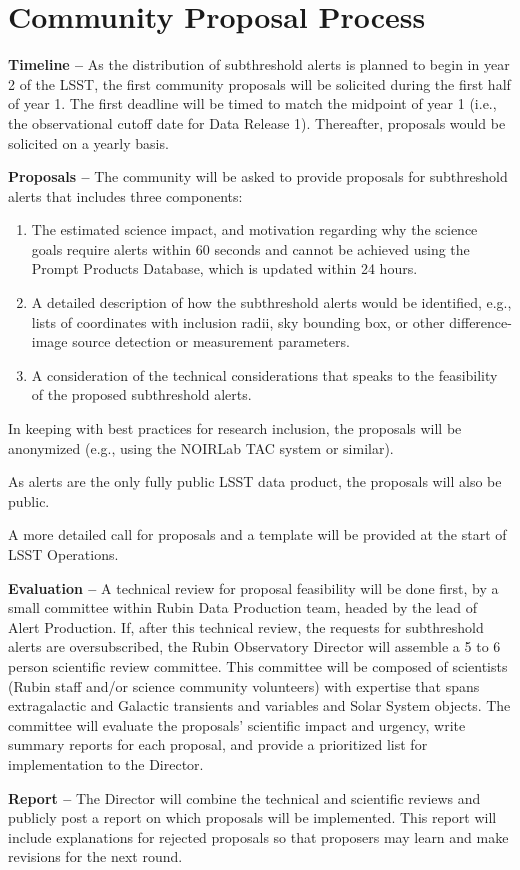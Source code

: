 \section{Community Proposal Process}\label{sec:process}

\textbf{Timeline --}
As the distribution of subthreshold alerts is planned to begin in year 2 of the LSST, the first community proposals will be solicited during the first half of year 1.
The first deadline will be timed to match the midpoint of year 1 (i.e., the observational cutoff date for Data Release 1).
Thereafter, proposals would be solicited on a yearly basis.

\textbf{Proposals --}
The community will be asked to provide proposals for subthreshold alerts that includes three components:

\begin{enumerate}
\item The estimated science impact, and motivation regarding why the science goals require alerts within 60 seconds and cannot be achieved using the Prompt Products Database, which is updated within 24 hours.
\item A detailed description of how the subthreshold alerts would be identified, e.g., lists of coordinates with inclusion radii, sky bounding box, or other difference-image source detection or measurement parameters.
\item A consideration of the technical considerations that speaks to the feasibility of the proposed subthreshold alerts.
\end{enumerate}

In keeping with best practices for research inclusion, the proposals will be anonymized (e.g., using the NOIRLab TAC system or similar).

As alerts are the only fully public LSST data product, the proposals will also be public.

A more detailed call for proposals and a template will be provided at the start of LSST Operations.

\textbf{Evaluation --} A technical review for proposal feasibility will be done first, by a small committee within Rubin Data Production team, headed by the lead of Alert Production.
If, after this technical review, the requests for subthreshold alerts are oversubscribed, the Rubin Observatory Director will assemble a 5 to 6 person scientific review committee.
This committee will be composed of scientists (Rubin staff and/or science community volunteers) with expertise that spans extragalactic and Galactic transients and variables and Solar System objects.
The committee will evaluate the proposals' scientific impact and urgency, write summary reports for each proposal, and provide a prioritized list for implementation to the Director.

\textbf{Report --} The Director will combine the technical and scientific reviews and publicly post a report on which proposals will be implemented.
This report will include explanations for rejected proposals so that proposers may learn and make revisions for the next round.
